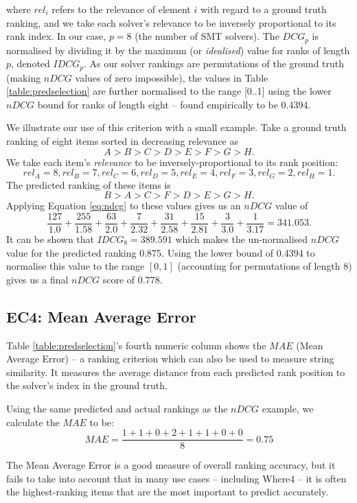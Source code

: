 where $rel_i$ refers to the relevance of element $i$ with regard to a ground truth ranking, and we take each solver's relevance to be inversely proportional to its rank index.  
In our case, $p = 8$ (the number of SMT solvers).  
The $DCG_p$ is normalised by dividing it by the maximum (or \textit{idealised}) value for ranks of length $p$, denoted $IDCG_p$. 
As our solver rankings are permutations of the ground truth (making $nDCG$ values of zero impossible), the values in Table \ref{table:predselection} are further normalised to the range [0..1] using the lower $nDCG$ bound for ranks of length eight -- found empirically to be 0.4394.

We illustrate our use of this criterion with a small example. 
Take a ground truth ranking of eight items sorted in decreasing relevance as
\[ A > B > C > D > E > F > G > H. \]
We take each item's \textit{relevance} to be inversely-proportional to its rank position:
\[rel_A=8, rel_B=7, rel_C=6, rel_D=5, rel_E=4, rel_F=3, rel_G=2, rel_H=1.\]
The predicted ranking of these items is
\[ B > A > C > F > D > E > G > H .\]
Applying Equation \ref{eq:ndcg} to these values gives us an $nDCG$ value of
\[
\frac{127}{1.0} + \frac{255}{1.58} + \frac{63}{2.0} + \frac{7}{2.32} + \frac{31}{2.58} + \frac{15}{2.81} + \frac{3}{3.0} + \frac{1}{3.17} = 341.053. 
\]
It can be shown that $IDCG_8 = 389.591$ which makes the un-normalised $nDCG$ value for the predicted ranking 0.875. Using the lower bound of 0.4394 to normalise this value to the range $\left[0, 1 \right]$ (accounting for permutations of length 8) gives us a final $nDCG$ score of 0.778. 



\subsection{EC4: Mean Average Error}

Table \ref{table:predselection}'s fourth numeric column shows the 
$MAE$ (Mean Average Error) -- a ranking criterion which can also be used to measure string similarity. It measures the average distance from each predicted rank position to the solver's index in the ground truth.

Using the same predicted and actual rankings as the $nDCG$ example, we calculate the $MAE$ to be:
\[
	MAE = \frac{1 + 1 + 0 + 2 + 1 + 1 + 0 + 0}{8} = 0.75
\]

The Mean Average Error is a good measure of overall ranking accuracy, but it fails to take into account that in many use cases -- including \textsf{Where4} -- it is often the highest-ranking items that are the most important to predict accurately. 

